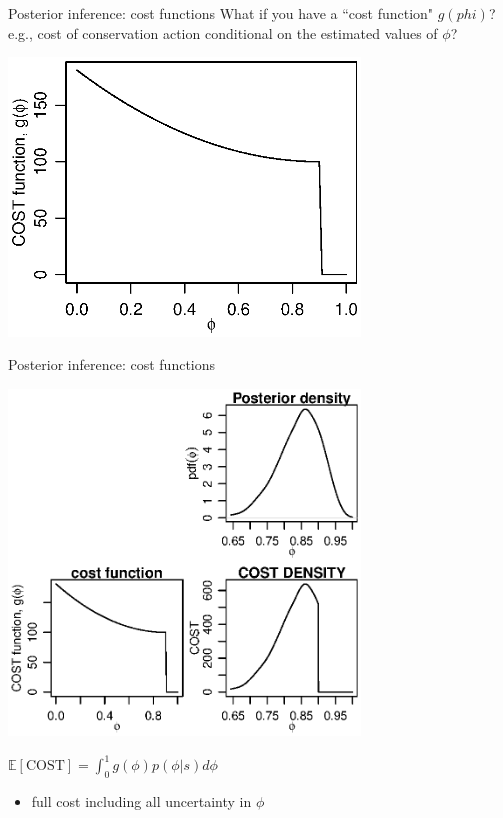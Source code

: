 \documentclass[presentation,9pt,xcolor=dvipsnames]{beamer}
\begin{document}
\begin{frame}[label={sec:org1cc91e6}]{Posterior inference: cost functions}
What if you have a ``cost function" \(g(phi)\)?
e.g., cost of conservation action conditional on the estimated values of \(\phi\)?
\begin{center}
\includegraphics[width=0.7\textwidth,height=0.7\textheight]{surv_cost_func.eps}
\end{center}
\end{frame}
\begin{frame}[label={sec:orgbc959a1}]{Posterior inference: cost functions}
\begin{center}
\includegraphics[width=0.7\textwidth,height=0.7\textheight]{surv_cost_est.eps}
\end{center}
\(\mathbb{E}[\text{COST}] = \int_0^1g(\phi)p(\phi\vert s)d\phi\)
\begin{itemize}
\item full cost including all uncertainty in \(\phi\)
\end{itemize}
\end{frame}
\end{document}
